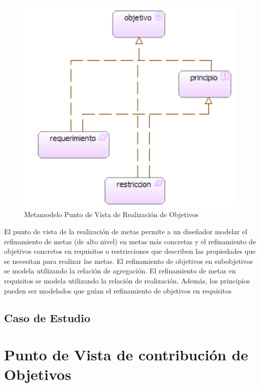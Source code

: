 \begin{figure}[th!]
	\centering
	\includegraphics[width=0.5\linewidth]{arquitectura/imagenes/modeloRealizacionObjetivos}
	\caption{Metamodelo Punto de Vista de Realización de Objetivos}
	\label{metamodelo realizacion objetivos}
\end{figure}
El punto de vista de la realización de metas permite a un diseñador modelar el refinamiento de metas (de alto nivel) en metas más concretas y el refinamiento de objetivos concretos en requisitos o restricciones que describen las propiedades que se necesitan para realizar las metas. El refinamiento de objetivos en subobjetivos se modela utilizando la relación de agregación. El refinamiento de metas en requisitos se modela utilizando la relación de realización.
Además, los principios pueden ser modelados que guían el refinamiento de objetivos en requisitos

\subsection{Caso de Estudio}

\newpage

\section{Punto de Vista de contribución de Objetivos}

